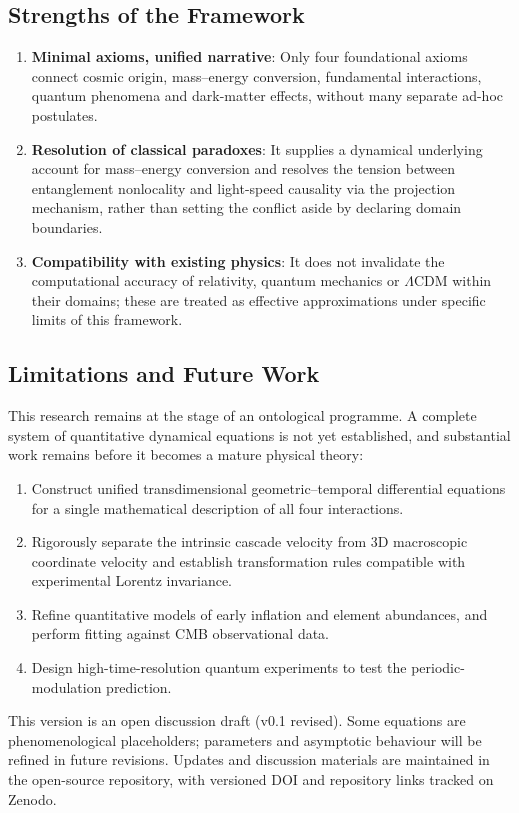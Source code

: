 \documentclass[12pt,a4paper]{article}
\begin{document}
\subsection{Strengths of the Framework}
\begin{enumerate}
\item \textbf{Minimal axioms, unified narrative}: Only four foundational axioms connect cosmic origin, mass–energy conversion, fundamental interactions, quantum phenomena and dark-matter effects, without many separate ad-hoc postulates.
\item \textbf{Resolution of classical paradoxes}: It supplies a dynamical underlying account for mass–energy conversion and resolves the tension between entanglement nonlocality and light-speed causality via the projection mechanism, rather than setting the conflict aside by declaring domain boundaries.
\item \textbf{Compatibility with existing physics}: It does not invalidate the computational accuracy of relativity, quantum mechanics or $\Lambda$CDM within their domains; these are treated as effective approximations under specific limits of this framework.
\end{enumerate}

\subsection{Limitations and Future Work}
This research remains at the stage of an ontological programme. A complete system of quantitative dynamical equations is not yet established, and substantial work remains before it becomes a mature physical theory:
\begin{enumerate}
\item Construct unified transdimensional geometric–temporal differential equations for a single mathematical description of all four interactions.
\item Rigorously separate the intrinsic cascade velocity from 3D macroscopic coordinate velocity and establish transformation rules compatible with experimental Lorentz invariance.
\item Refine quantitative models of early inflation and element abundances, and perform fitting against CMB observational data.
\item Design high-time-resolution quantum experiments to test the periodic-modulation prediction.
\end{enumerate}

This version is an open discussion draft (v0.1 revised). Some equations are phenomenological placeholders; parameters and asymptotic behaviour will be refined in future revisions. Updates and discussion materials are maintained in the open-source repository, with versioned DOI and repository links tracked on Zenodo.
\end{document}
